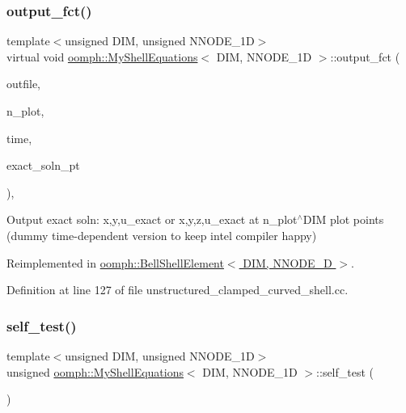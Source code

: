 \subsubsection{\texorpdfstring{output\+\_\+fct()}{output\_fct()}\hspace{0.1cm}{\footnotesize\ttfamily [2/2]}}
{\footnotesize\ttfamily template$<$unsigned D\+IM, unsigned N\+N\+O\+D\+E\+\_\+1D$>$ \\
virtual void \hyperlink{classoomph_1_1MyShellEquations}{oomph\+::\+My\+Shell\+Equations}$<$ D\+IM, N\+N\+O\+D\+E\+\_\+1D $>$\+::output\+\_\+fct (\begin{DoxyParamCaption}\item[{std\+::ostream \&}]{outfile,  }\item[{const unsigned \&}]{n\+\_\+plot,  }\item[{const double \&}]{time,  }\item[{Finite\+Element\+::\+Unsteady\+Exact\+Solution\+Fct\+Pt}]{exact\+\_\+soln\+\_\+pt }\end{DoxyParamCaption})\hspace{0.3cm}{\ttfamily [inline]}, {\ttfamily [virtual]}}



Output exact soln\+: x,y,u\+\_\+exact or x,y,z,u\+\_\+exact at n\+\_\+plot$^\wedge$\+D\+IM plot points (dummy time-\/dependent version to keep intel compiler happy) 



Reimplemented in \hyperlink{classoomph_1_1BellShellElement_a5589f860978d78c64278afdbc72f5f5d}{oomph\+::\+Bell\+Shell\+Element$<$ D\+I\+M, N\+N\+O\+D\+E\+\_\+D $>$}.



Definition at line 127 of file unstructured\+\_\+clamped\+\_\+curved\+\_\+shell.\+cc.

\mbox{\label{classoomph_1_1MyShellEquations_ab78a1d617fdd782b3e60ffd89e0c4737}} 
\subsubsection{\texorpdfstring{self\+\_\+test()}{self\_test()}}
{\footnotesize\ttfamily template$<$unsigned D\+IM, unsigned N\+N\+O\+D\+E\+\_\+1D$>$ \\
unsigned \hyperlink{classoomph_1_1MyShellEquations}{oomph\+::\+My\+Shell\+Equations}$<$ D\+IM, N\+N\+O\+D\+E\+\_\+1D $>$\+::self\+\_\+test (\begin{DoxyParamCaption}{ }\end{DoxyParamCaption})}



